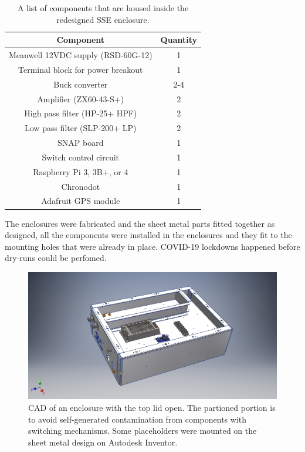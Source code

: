 \begin{table}
	\centering
	\begin{tabular}{ c|c}
		\hline
		 Component & Quantity \\
		 \hline
		 \hline
		 Meanwell 12VDC supply (RSD-60G-12) & 1 \\
		 Terminal block for power breakout & 1 \\
		 Buck converter & 2-4 \\
		 Amplifier (ZX60-43-S+) & 2 \\
		 High pass filter (HP-25+ HPF) & 2 \\
		 Low pass filter (SLP-200+ LP) & 2 \\
		 SNAP board	& 1 \\
		 Switch control circuit & 1 \\
		 Raspberry Pi 3, 3B+, or 4 & 1 \\
		 Chronodot & 1 \\
		 Adafruit GPS module & 1 \\		 
		 \hline
	\end{tabular}
	\caption{A list of components that are housed inside the redesigned SSE enclosure.}
	\label{Tab:Components}
\end{table}

The enclosures were fabricated and the sheet metal parts fitted together as designed, all the components were installed in the enclosures and they fit to the mounting holes that were already in place. COVID-19 lockdowns happened before dry-runs could be perfomed. 

\begin{figure}
	\centering
	\includegraphics[width=\linewidth]{"Figures/Top Open"} 
	\caption{CAD of an enclosure with the top lid open. The partioned portion is to avoid self-generated contamination from components with switching mechanisms. Some placeholders were mounted on the sheet metal design on Autodesk Inventor.} 
	\label{Fig:Top Open}
\end{figure}

